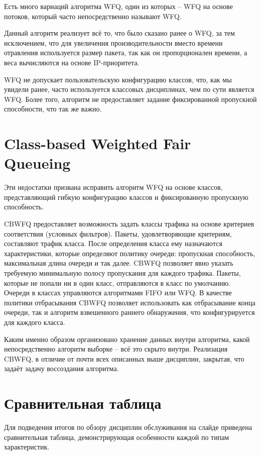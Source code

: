 \documentclass[12pt]{ncc}
\begin{document}
	Есть много вариаций алгоритма WFQ, один из которых -- WFQ на основе
	потоков, который часто непосредственно называют WFQ.

	Данный алгоритм реализует всё то, что было сказано ранее
	о WFQ, за тем исключением, что для увеличения
	производительности вместо времени отравления используется
	размер пакета, так как он пропорционален времени, а
	веса вычисляются на основе IP-приоритета.
	
	WFQ не допускает пользовательскую конфигурацию классов,
	что, как мы увидели ранее, часто используется классовых
	дисциплинах, чем по сути является WFQ. Более того,
	алгоритм не предоставляет задание фиксированной пропускной способности,
	что так же важно.

	\section{Class-based Weighted Fair Queueing}

	Эти недостатки призвана исправить алгоритм WFQ на основе классов,
	представляющий гибкую конфигурацию классов и фиксированную
	пропускную способность. 

	CBWFQ предоставляет возможность задать классы трафика на 
	основе критериев соответствия (условных фильтров).
	Пакеты, удовлетворяющие критериям, составляют трафик класса.
	После определения класса ему назначаются характеристики,
	которые определяют политику очереди: пропускная способность,
	максимальная длина очереди и так далее. CBWFQ позволяет
	явно указать требуемую минимальную полосу пропускания для
	каждого трафика. Пакеты, которые не попали ни в один класс,
	отправляются в класс по умолчанию. Очереди в
	классах управляются алгоритмами FIFO или WFQ.
	В качестве политики отбрасывания CBWFQ позволяет использовать как
	отбрасывание конца очереди, так и алгоритм взвешенного раннего
	обнаружения, что конфигурируется для каждого класса. 


	Каким именно образом организовано хранение данных внутри алгоритма,
	какой непосредственно алгоритм выборке -- всё это скрыто внутри.
	Реализация CBWFQ, в отличие от почти всех описанных выше дисциплин,
	закрытая, что задаёт задачу воссоздания алгоритма.


	\section{Сравнительная таблица}

	Для подведения итогов по обзору дисциплин обслуживания
	на слайде приведена сравнительная таблица, демонстрирующая
	особенности каждой по типам характеристик.
\end{document}

